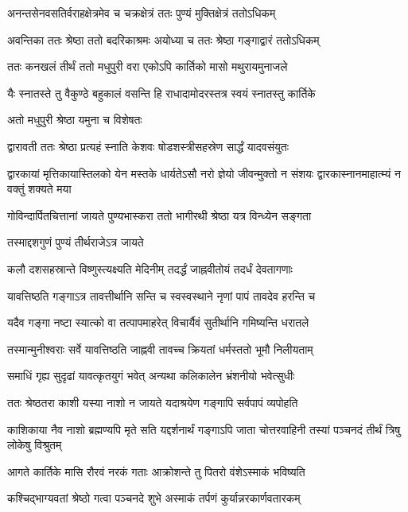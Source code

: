 \twolineshloka
{अनन्तसेनवसतिर्वराहक्षेत्रमेव च}
{चक्रक्षेत्रं ततः पुण्यं मुक्तिक्षेत्रं ततोऽधिकम्} %

\twolineshloka
{अवन्तिका ततः श्रेष्ठा ततो बदरिकाश्रमः}
{अयोध्या च ततः श्रेष्ठा गङ्गाद्वारं ततोऽधिकम्} %

\twolineshloka
{ततः कनखलं तीर्थं ततो मधुपुरी वरा}
{एकोऽपि कार्तिको मासो मथुरायमुनाजले} %

\twolineshloka
{यैः स्नातस्ते तु वैकुण्ठे बहुकालं वसन्ति हि}
{राधादामोदरस्तत्र स्वयं स्नातस्तु कार्तिके} %


\onelineshloka
{अतो मधुपुरी श्रेष्ठा यमुना च विशेषतः} %

\twolineshloka
{द्वारावती ततः श्रेष्ठा प्रत्यहं स्नाति केशवः}
{षोडशस्त्रीसहस्रेण सार्द्धं यादवसंयुतः} %

\threelineshloka
{द्वारकायां मृत्तिकायास्तिलको येन मस्तके}
{धार्यतेऽसौ नरो ज्ञेयो जीवन्मुक्तो न संशयः}
{द्वारकास्नानमाहात्म्यं न वक्तुं शक्यते मया} %

\twolineshloka
{गोविन्दार्पितचित्तानां जायते पुण्यभास्करा}
{ततो भागीरथी श्रेष्ठा यत्र विन्ध्येन सङ्गता} %


\onelineshloka
{तस्माद्दशगुणं पुण्यं तीर्थराजेऽत्र जायते} %

\twolineshloka
{कलौ दशसहस्रान्ते विष्णुस्त्यक्ष्यति मेदिनीम्}
{तदर्द्धं जाह्नवीतोयं तदर्धं देवतागणाः} %

\twolineshloka
{यावत्तिष्ठति गङ्गाऽत्र तावत्तीर्थानि सन्ति च}
{स्वस्वस्थाने नृणां पापं तावदेव हरन्ति च} %

\twolineshloka
{यदैव गङ्गा नष्टा स्यात्को वा तत्पापमाहरेत्}
{विचार्यैवं सुतीर्थानि गमिष्यन्ति धरातले} %

\twolineshloka
{तस्मान्मुनीश्वराः सर्वे यावत्तिष्ठति जाह्नवी}
{तावच्च क्रियतां धर्मस्ततो भूमौ निलीयताम्} %

\twolineshloka
{समाधिं गृह्य सुदृढां यावत्कृतयुगं भवेत्}
{अन्यथा कलिकालेन भ्रंशनीयो भवेत्सुधीः} %

\twolineshloka
{ततः श्रेष्ठतरा काशी यस्या नाशो न जायते}
{यदाश्रयेण गङ्गापि सर्वपापं व्यपोहति} %

\threelineshloka
{काशिकाया नैव नाशो ब्रह्मण्यपि मृते सति}
{यद्दर्शनार्थं गङ्गाऽपि जाता चोत्तरवाहिनी}
{तस्यां पञ्चनदं तीर्थं त्रिषु लोकेषु विश्रुतम्} %

\twolineshloka
{आगते कार्तिके मासि रौरवं नरकं गताः}
{आक्रोशन्ते तु पितरो वंशेऽस्माकं भविष्यति} %

\twolineshloka
{कश्चिद्भाग्यवतां श्रेष्ठो गत्वा पञ्चनदे शुभे}
{अस्माकं तर्पणं कुर्यान्नरकार्णवतारकम्} %

